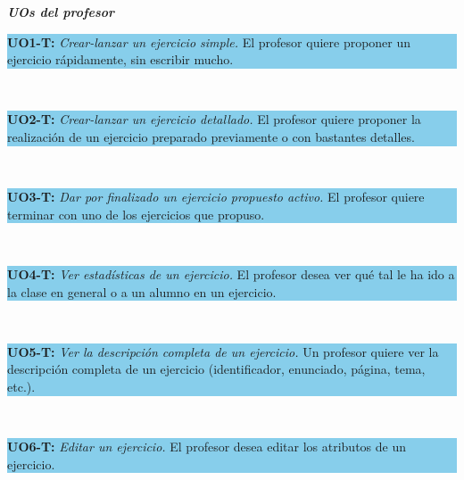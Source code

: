\vspace{0.3cm}

\textbf\textit{\large UOs del profesor}\\

\colorbox{SkyBlue}{\parbox[c]{1.0\textwidth}{
\textbf{UO1-T:} \textit{Crear-lanzar un ejercicio simple.} El profesor quiere proponer un ejercicio rápidamente, sin escribir mucho.\\
}}\\

\vspace{0.1cm}

\colorbox{SkyBlue}{\parbox[c]{1.0\textwidth}{
\textbf{UO2-T:} \textit{Crear-lanzar un ejercicio detallado.} El profesor quiere proponer la realización de un ejercicio preparado previamente o con bastantes detalles.\\
}}\\

\vspace{0.1cm}

\colorbox{SkyBlue}{\parbox[c]{1.0\textwidth}{
\textbf{UO3-T:} \textit{Dar por finalizado un ejercicio propuesto activo.} El profesor quiere terminar con uno de los ejercicios que propuso.\\
}}\\

\vspace{0.1cm}

\colorbox{SkyBlue}{\parbox[c]{1.0\textwidth}{
\textbf{UO4-T:} \textit{Ver estadísticas de un ejercicio.} El profesor desea ver qué tal le ha ido a la clase en general o a un alumno en un ejercicio.\\
}}\\

\vspace{0.1cm}

\colorbox{SkyBlue}{\parbox[c]{1.0\textwidth}{
\textbf{UO5-T:} \textit{Ver la descripción completa de un ejercicio.} Un profesor quiere ver la descripción completa de un ejercicio (identificador, enunciado, página, tema, etc.).\\
}}\\

\vspace{0.1cm}

\colorbox{SkyBlue}{\parbox[c]{1.0\textwidth}{
\textbf{UO6-T:} \textit{Editar un ejercicio.} El profesor desea editar los atributos de un ejercicio.\\
}}\\

